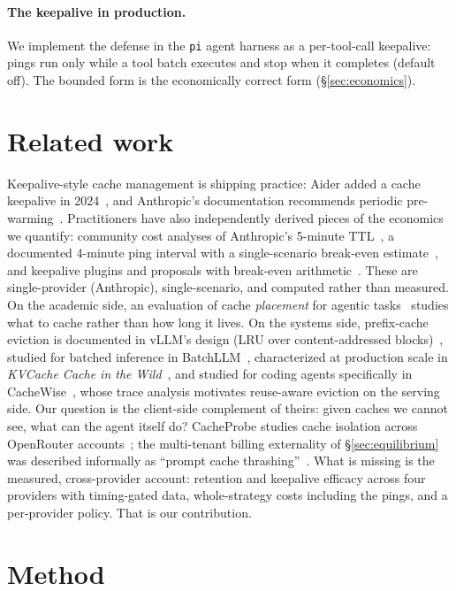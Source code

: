 \documentclass[10pt,twocolumn]{article}
\begin{document}
\paragraph{The keepalive in production.}
We implement the defense in the \texttt{pi} agent harness as a per-tool-call
keepalive: pings run only while a tool batch executes and stop when it
completes (default off). The bounded form is the economically correct form
(\S\ref{sec:economics}).

\section{Related work}
Keepalive-style cache management is shipping practice: Aider added a cache
keepalive in 2024~\cite{aider-keepalive}, and Anthropic's documentation
recommends periodic pre-warming~\cite{anthropic-prewarm}. Practitioners have
also independently derived pieces of the economics we quantify: community cost
analyses of Anthropic's 5-minute TTL~\cite{brandonwie-ttl}, a documented
4-minute ping interval with a single-scenario break-even
estimate~\cite{veritas-coffee}, and keepalive plugins and proposals with
break-even arithmetic~\cite{cc-cache-keepalive,openclaw-keepalive}. These are
single-provider
(Anthropic), single-scenario, and computed rather than measured. On the
academic side, an evaluation of cache \emph{placement} for agentic
tasks~\cite{dontbreakcache} studies what to cache rather than how long it
lives. On the systems side, prefix-cache eviction is documented in vLLM's
design (LRU over content-addressed blocks)~\cite{vllm-prefix-caching}, studied
for batched inference in BatchLLM~\cite{batchllm}, characterized at
production scale in \emph{KVCache Cache in the Wild}~\cite{kvcache-wild}, and
studied for coding agents specifically in CacheWise~\cite{cachewise}, whose
trace analysis motivates reuse-aware eviction on the serving side. Our
question is the client-side complement of theirs: given caches we cannot see,
what can the agent itself do?
CacheProbe studies cache isolation across OpenRouter accounts~\cite{cacheprobe};
the multi-tenant billing externality of \S\ref{sec:equilibrium} was described
informally as ``prompt cache thrashing''~\cite{cache-thrashing-blog}. What is
missing is the measured, cross-provider account: retention and keepalive
efficacy across four providers with timing-gated data, whole-strategy costs
including the pings, and a per-provider policy. That is our contribution.

\section{Method}
\label{sec:method}
\end{document}
